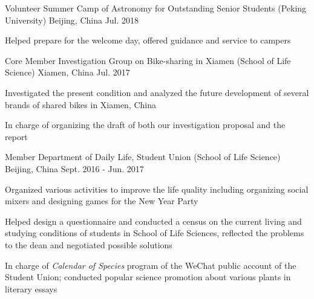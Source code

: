 


\begin{cventries}


\cventry
{Volunteer} %
{Summer Camp of Astronomy for Outstanding Senior Students (Peking University)} %
{Beijing, China} %
{Jul. 2018} %
{ %
	\begin{cvitems}
		\item {Helped prepare for the welcome day, offered guidance and service to campers}
	\end{cvitems}
}


\cventry
{Core Member} %
{Investigation Group on Bike-sharing in Xiamen (School of Life Science)} %
{Xiamen, China} %
{Jul. 2017} %
{ %
\begin{cvitems}
\item {Investigated the present condition and analyzed the future development of several brands of shared bikes in Xiamen, China}
\item {In charge of organizing the draft of both our investigation proposal and the report}
\end{cvitems}
}


\cventry
{Member} %
{Department of Daily Life, Student Union (School of Life Science)} %
{Beijing, China} %
{Sept. 2016 - Jun. 2017} %
{ %
\begin{cvitems}
\item {Organized various activities to improve the life quality including organizing social mixers and designing games for the New Year Party}
\item {Helped design a questionnaire and conducted a census on the current living and studying conditions of students in School of Life Sciences, reflected the problems to the dean and negotiated possible solutions}
\item {In charge of \textit{Calendar of Species} program of the WeChat public account of the Student Union; conducted popular science promotion about various plants in literary essays}
\end{cvitems}
}


\end{cventries}